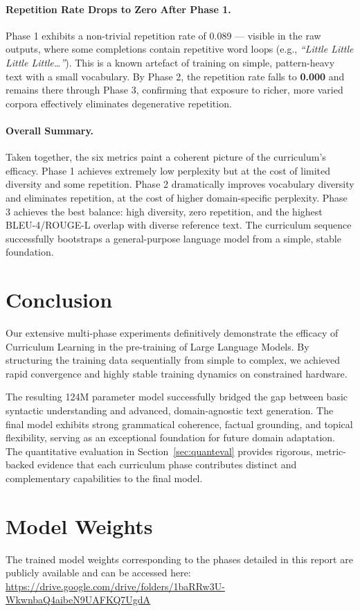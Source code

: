 \documentclass[12pt]{article}
\begin{document}
\paragraph{Repetition Rate Drops to Zero After Phase 1.}
Phase 1 exhibits a non-trivial repetition rate of 0.089 — visible in the raw outputs, where some completions contain repetitive word loops (e.g., \textit{``Little Little Little Little\ldots''}). This is a known artefact of training on simple, pattern-heavy text with a small vocabulary. By Phase 2, the repetition rate falls to \textbf{0.000} and remains there through Phase 3, confirming that exposure to richer, more varied corpora effectively eliminates degenerative repetition.

\paragraph{Overall Summary.}
Taken together, the six metrics paint a coherent picture of the curriculum's efficacy. Phase 1 achieves extremely low perplexity but at the cost of limited diversity and some repetition. Phase 2 dramatically improves vocabulary diversity and eliminates repetition, at the cost of higher domain-specific perplexity. Phase 3 achieves the best balance: high diversity, zero repetition, and the highest BLEU-4/ROUGE-L overlap with diverse reference text. The curriculum sequence successfully bootstraps a general-purpose language model from a simple, stable foundation.

\section{Conclusion}
Our extensive multi-phase experiments definitively demonstrate the efficacy of Curriculum Learning in the pre-training of Large Language Models. By structuring the training data sequentially from simple to complex, we achieved rapid convergence and highly stable training dynamics on constrained hardware. 

The resulting 124M parameter model successfully bridged the gap between basic syntactic understanding and advanced, domain-agnostic text generation. The final model exhibits strong grammatical coherence, factual grounding, and topical flexibility, serving as an exceptional foundation for future domain adaptation. The quantitative evaluation in Section~\ref{sec:quanteval} provides rigorous, metric-backed evidence that each curriculum phase contributes distinct and complementary capabilities to the final model.

\section*{Model Weights}
The trained model weights corresponding to the phases detailed in this report are publicly available and can be accessed here: \\
\url{https://drive.google.com/drive/folders/1baRRw3U-WkwnbaQ4aibeN9UAFKQ7UgdA}
\end{document}
